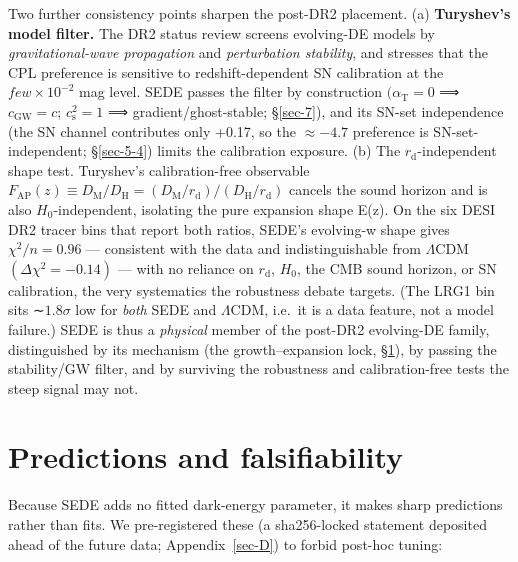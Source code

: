 \documentclass[preprint,12pt]{elsarticle}
\begin{document}
Two further consistency points sharpen the post-DR2 placement. (a)
\textbf{Turyshev's model filter.} The DR2 status review
\citep{Turyshev:2026ewm} screens evolving-DE models by
\emph{gravitational-wave propagation} and \emph{perturbation stability},
and stresses that the CPL preference is sensitive to redshift-dependent
SN calibration at the \(few\times 10^{-2}\) mag level. SEDE passes the
filter by construction \((\alpha _{\mathrm{T}} = 0\) ⟹
\(c_\mathrm{GW} = c\); \(c_{\mathrm{s}}^{2} = 1\) ⟹
gradient/ghost-stable; §\ref{sec-7}), and its SN-set independence (the
SN channel contributes only +0.17, so the \(\approx  -4.7\) preference
is SN-set-independent; §\ref{sec-5-4}) limits the calibration exposure.
(b) The \(r_{\mathrm{d}}\)-independent shape test. Turyshev's
calibration-free observable
\(F_\mathrm{AP}(z) \equiv  D_{\mathrm{M}}/D_{\mathrm{H}} = (D_{\mathrm{M}}/r_{\mathrm{d}})/(D_{\mathrm{H}}/r_{\mathrm{d}})\)
cancels the sound horizon and is also \(H_{0}\)-independent, isolating
the pure expansion shape E(z). On the six DESI DR2 tracer bins that
report both ratios, SEDE's evolving-w shape gives \(\chi ^{2}/n = 0.96\)
--- consistent with the data and indistinguishable from
\(\Lambda \mathrm{CDM}\) \((\Delta \chi ^{2} = -0.14)\) --- with no
reliance on \(r_{\mathrm{d}}\), \(H_{0}\), the CMB sound horizon, or SN
calibration, the very systematics the robustness debate targets. (The
LRG1 bin sits ∼\(1.8\sigma\) low for \emph{both} SEDE and
\(\Lambda \mathrm{CDM}\), i.e.~it is a data feature, not a model
failure.) SEDE is thus a \emph{physical} member of the post-DR2
evolving-DE family, distinguished by its mechanism (the
growth--expansion lock, §\ref{sec-6}), by passing the stability/GW
filter, and by surviving the robustness and calibration-free tests the
steep signal may not.

\section{Predictions and falsifiability}\label{sec-6}

Because SEDE adds no fitted dark-energy parameter, it makes sharp
predictions rather than fits. We pre-registered these (a sha256-locked
statement deposited ahead of the future data; Appendix~\ref{sec-D}) to
forbid post-hoc tuning:
\end{document}
